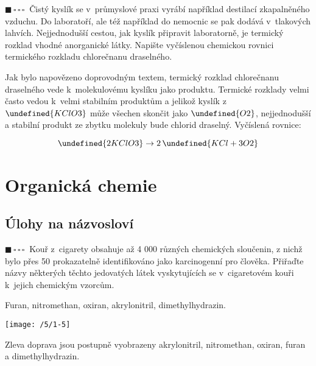 \documentclass{book}
\let\ch\undefined
\newcommand{\jeden}{$\blacksquare \, \square \, \square \, \square \; \; $}
\renewenvironment{quotation}{\par}{\par} %
\begin{document}
\hrulefill %
\begin{quotation}
\jeden Čistý kyslík se v~průmyslové praxi vyrábí například destilací zkapalněného vzduchu.
Do laboratoří, ale též například do nemocnic se pak dodává v~tlakových lahvích.
Nejjednodušší cestou, jak kyslík připravit laboratorně, je termický
rozklad vhodné anorganické látky. Napište vyčíslenou chemickou rovnici
termického rozkladu chlorečnanu draselného.
\end{quotation} \dotfill \par 
Jak bylo napovězeno doprovodným textem, termický rozklad chlorečnanu
draselného vede k~molekulovému kyslíku jako produktu. Termické rozklady
velmi často vedou k~velmi stabilním produktům a jelikož kyslík z~$\ch{KClO3}$
může všechen skončit jako $\ch{O2}$, nejjednodušší a stabilní produkt
ze zbytku molekuly bude chlorid draselný. Vyčíslená rovnice:

\[
\ch{2 KClO3}\rightarrow 2\,\ch{KCl + 3 O2}
\]


\chapter{Organická chemie}

\section{Úlohy na názvosloví}

\begin{quotation}
\jeden Kouř z~cigarety obsahuje až 4 000 různých chemických sloučenin, z
nichž bylo přes 50 prokazatelně identifikováno jako karcinogenní pro
člověka. Přiřaďte názvy některých těchto jedovatých látek vyskytujících
se v~cigaretovém kouři k~jejich chemickým vzorcům.

Furan, nitromethan, oxiran, akrylonitril, dimethylhydrazin. 
\begin{center}
\texttt{[image: /5/1-5]}
\par\end{center}

\end{quotation} \dotfill \par 
Zleva doprava jsou postupně vyobrazeny akrylonitril, nitromethan,
oxiran, furan a dimethylhydrazin.
\end{document}
